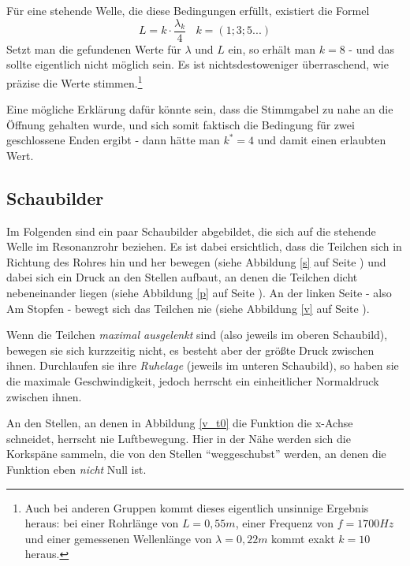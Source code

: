 Für eine stehende Welle, die diese Bedingungen erfüllt, existiert die Formel 
\begin{equation}
	L = k \cdot \frac{\lambda_k}{4} ~~~~ k = (1; 3; 5 ...)
	\label{offenzu}
\end{equation}
Setzt man die gefundenen Werte für \(\lambda\) und \(L\) ein, so erhält man \(k = 8\) - und das sollte eigentlich nicht möglich sein. Es ist nichtsdestoweniger überraschend, wie präzise die Werte stimmen.\footnote{Auch bei anderen Gruppen kommt dieses eigentlich unsinnige Ergebnis heraus: bei einer Rohrlänge von \(L = 0,55m\), einer Frequenz von \(f = 1700Hz\) und einer gemessenen Wellenlänge von \(\lambda = 0,22m\) kommt exakt \(k = 10\) heraus.}

Eine mögliche Erklärung dafür könnte sein, dass die Stimmgabel zu nahe an die Öffnung gehalten wurde, und sich somit faktisch die Bedingung für zwei geschlossene Enden ergibt - dann hätte man \(k^* = 4\) und damit einen erlaubten Wert.


\subsection{Schaubilder}

Im Folgenden sind ein paar Schaubilder abgebildet, die sich auf die stehende Welle im Resonanzrohr beziehen. Es ist dabei ersichtlich, dass die Teilchen sich in Richtung des Rohres hin und her bewegen (siehe Abbildung \ref{s} auf Seite \pageref{s}) und dabei sich ein Druck an den Stellen aufbaut, an denen die Teilchen dicht nebeneinander liegen (siehe Abbildung \ref{p} auf Seite \pageref{p}). An der linken Seite - also Am Stopfen - bewegt sich das Teilchen nie (siehe Abbildung \ref{v} auf Seite \pageref{v}).

Wenn die Teilchen \textit{maximal ausgelenkt} sind (also jeweils im oberen Schaubild), bewegen sie sich kurzzeitig nicht, es besteht aber der größte Druck zwischen ihnen. Durchlaufen sie ihre \textit{Ruhelage} (jeweils im unteren Schaubild), so haben sie die maximale Geschwindigkeit, jedoch herrscht ein einheitlicher Normaldruck zwischen ihnen.

An den Stellen, an denen in Abbildung \ref{v_t0} die Funktion die x-Achse schneidet, herrscht nie Luftbewegung. Hier in der Nähe werden sich die Korkspäne sammeln, die von den Stellen ``weggeschubst'' werden, an denen die Funktion eben \emph{nicht} Null ist.




